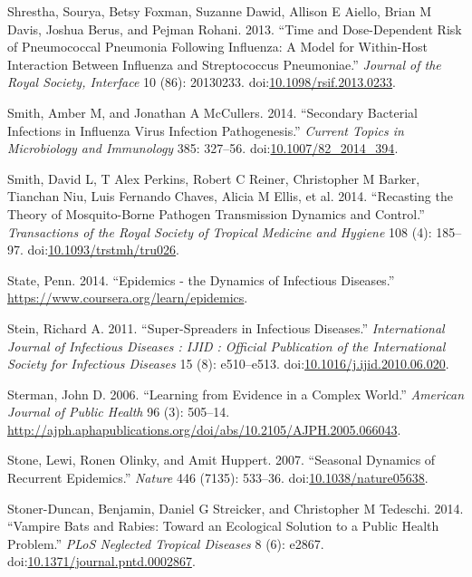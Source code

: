 \documentclass[]{book}
\theoremstyle{definition}
\theoremstyle{definition}
\theoremstyle{definition}
\theoremstyle{remark}
\begin{document}
\hypertarget{ref-shrestha13}{}
Shrestha, Sourya, Betsy Foxman, Suzanne Dawid, Allison E Aiello, Brian M
Davis, Joshua Berus, and Pejman Rohani. 2013. ``Time and Dose-Dependent
Risk of Pneumococcal Pneumonia Following Influenza: A Model for
Within-Host Interaction Between Influenza and Streptococcus
Pneumoniae.'' \emph{Journal of the Royal Society, Interface} 10 (86):
20130233.
doi:\href{https://doi.org/10.1098/rsif.2013.0233}{10.1098/rsif.2013.0233}.

\hypertarget{ref-smith14a}{}
Smith, Amber M, and Jonathan A McCullers. 2014. ``Secondary Bacterial
Infections in Influenza Virus Infection Pathogenesis.'' \emph{Current
Topics in Microbiology and Immunology} 385: 327--56.
doi:\href{https://doi.org/10.1007/82_2014_394}{10.1007/82\_2014\_394}.

\hypertarget{ref-smith14}{}
Smith, David L, T Alex Perkins, Robert C Reiner, Christopher M Barker,
Tianchan Niu, Luis Fernando Chaves, Alicia M Ellis, et al. 2014.
``Recasting the Theory of Mosquito-Borne Pathogen Transmission Dynamics
and Control.'' \emph{Transactions of the Royal Society of Tropical
Medicine and Hygiene} 108 (4): 185--97.
doi:\href{https://doi.org/10.1093/trstmh/tru026}{10.1093/trstmh/tru026}.

\hypertarget{ref-epimooc}{}
State, Penn. 2014. ``Epidemics - the Dynamics of Infectious Diseases.''
\url{https://www.coursera.org/learn/epidemics}.

\hypertarget{ref-stein11}{}
Stein, Richard A. 2011. ``Super-Spreaders in Infectious Diseases.''
\emph{International Journal of Infectious Diseases : IJID : Official
Publication of the International Society for Infectious Diseases} 15
(8): e510--e513.
doi:\href{https://doi.org/10.1016/j.ijid.2010.06.020}{10.1016/j.ijid.2010.06.020}.

\hypertarget{ref-sterman06}{}
Sterman, John D. 2006. ``Learning from Evidence in a Complex World.''
\emph{American Journal of Public Health} 96 (3): 505--14.
\url{http://ajph.aphapublications.org/doi/abs/10.2105/AJPH.2005.066043}.

\hypertarget{ref-stone07}{}
Stone, Lewi, Ronen Olinky, and Amit Huppert. 2007. ``Seasonal Dynamics
of Recurrent Epidemics.'' \emph{Nature} 446 (7135): 533--36.
doi:\href{https://doi.org/10.1038/nature05638}{10.1038/nature05638}.

\hypertarget{ref-stoner-duncan14}{}
Stoner-Duncan, Benjamin, Daniel G Streicker, and Christopher M Tedeschi.
2014. ``Vampire Bats and Rabies: Toward an Ecological Solution to a
Public Health Problem.'' \emph{PLoS Neglected Tropical Diseases} 8 (6):
e2867.
doi:\href{https://doi.org/10.1371/journal.pntd.0002867}{10.1371/journal.pntd.0002867}.
\end{document}
